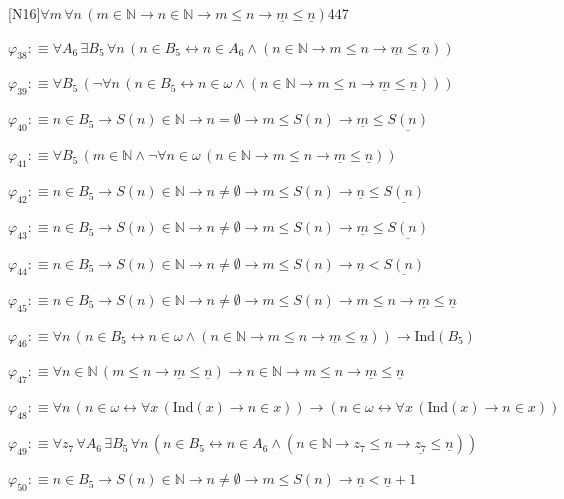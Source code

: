 \begin{fullproof}{[N16]}{$\forall m\,\forall n\,(m \in \mathbb{N} \to n \in \mathbb{N} \to m \leq n \to \underline{m} \leq \underline{n})$}{447}
\begin{abbrevlist}
\item $\varphi_{38} :\equiv \forall A_{6}\,\exists B_{5}\,\forall n\,(n \in B_{5} \leftrightarrow n \in A_{6} \land (n \in \mathbb{N} \to m \leq n \to \underline{m} \leq \underline{n}))$
\item $\varphi_{39} :\equiv \forall B_{5}\,(\neg \forall n\,(n \in B_{5} \leftrightarrow n \in \omega \land (n \in \mathbb{N} \to m \leq n \to \underline{m} \leq \underline{n})))$
\item $\varphi_{40} :\equiv n \in B_{5} \to S(n) \in \mathbb{N} \to n = \emptyset \to m \leq S(n) \to \underline{m} \leq \underline{S(n)}$
\item $\varphi_{41} :\equiv \forall B_{5}\,(m \in \mathbb{N} \land \neg \forall n \in \omega\,(n \in \mathbb{N} \to m \leq n \to \underline{m} \leq \underline{n}))$
\item $\varphi_{42} :\equiv n \in B_{5} \to S(n) \in \mathbb{N} \to n \neq \emptyset \to m \leq S(n) \to \underline{n} \leq \underline{S(n)}$
\item $\varphi_{43} :\equiv n \in B_{5} \to S(n) \in \mathbb{N} \to n \neq \emptyset \to m \leq S(n) \to \underline{m} \leq \underline{S(n)}$
\item $\varphi_{44} :\equiv n \in B_{5} \to S(n) \in \mathbb{N} \to n \neq \emptyset \to m \leq S(n) \to \underline{n} < \underline{S(n)}$
\item $\varphi_{45} :\equiv n \in B_{5} \to S(n) \in \mathbb{N} \to n \neq \emptyset \to m \leq S(n) \to m \leq n \to \underline{m} \leq \underline{n}$
\item $\varphi_{46} :\equiv \forall n\,(n \in B_{5} \leftrightarrow n \in \omega \land (n \in \mathbb{N} \to m \leq n \to \underline{m} \leq \underline{n})) \to \mathrm{Ind}(B_{5})$
\item $\varphi_{47} :\equiv \forall n \in \mathbb{N}\,(m \leq n \to \underline{m} \leq \underline{n}) \to n \in \mathbb{N} \to m \leq n \to \underline{m} \leq \underline{n}$
\item $\varphi_{48} :\equiv \forall n\,(n \in \omega \leftrightarrow \forall x\,(\mathrm{Ind}(x) \to n \in x)) \to (n \in \omega \leftrightarrow \forall x\,(\mathrm{Ind}(x) \to n \in x))$
\item $\varphi_{49} :\equiv \forall z_{7}\,\forall A_{6}\,\exists B_{5}\,\forall n\,(n \in B_{5} \leftrightarrow n \in A_{6} \land (n \in \mathbb{N} \to z_{7} \leq n \to \underline{z_{7}} \leq \underline{n}))$
\item $\varphi_{50} :\equiv n \in B_{5} \to S(n) \in \mathbb{N} \to n \neq \emptyset \to m \leq S(n) \to \underline{n} < \underline{n} + 1$

\end{abbrevlist}
\end{fullproof}
